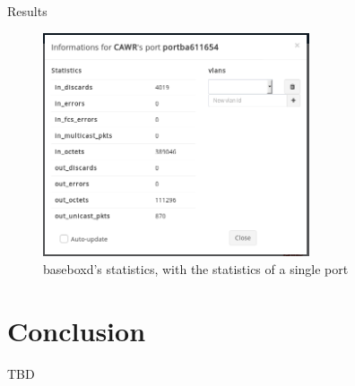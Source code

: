 \documentclass{beamer}
\begin{document}
\begin{frame}{Results}
    \begin{figure}[!tbph]
      \centering
      \includegraphics[width=0.7\textwidth]{bisdn/basebox_gui}
      \caption {baseboxd's statistics, with the statistics of a single port}
    \end{figure}
\end{frame}
\section{Conclusion}

\begin{frame}{}
    TBD
\end{frame}

\printbibliography
\end{document}
